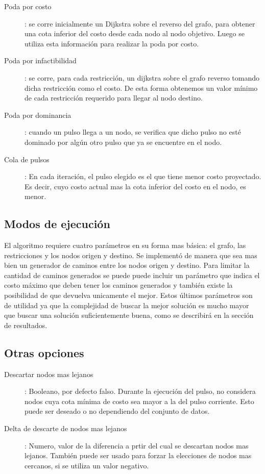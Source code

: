 \documentclass{article}
\begin{document}
  \begin{description}
    \item[Poda por costo]: {se corre inicialmente un Dijkstra sobre el reverso del grafo, para obtener una cota inferior del costo desde cada nodo al nodo objetivo. Luego se utiliza esta información para realizar la poda por costo.}
    \item[Poda por infactibilidad]: {se corre, para cada restricción, un dijkstra sobre el grafo reverso tomando dicha restricción como el costo. De esta forma obtenemos un valor mínimo de cada restricción requerido para llegar al nodo destino.}
    \item[Poda por dominancia]: {cuando un pulso llega a un nodo, se verifica que dicho pulso no esté dominado por algún otro pulso que ya se encuentre en el nodo.}
    \item[Cola de pulsos]: {En cada iteración, el pulso elegido es el que tiene menor costo proyectado. Es decir, cuyo costo actual mas la cota inferior del costo en el nodo, es menor.}
  \end{description}

  \subsection*{Modos de ejecución}

  El algoritmo requiere cuatro parámetros en su forma mas básica: el grafo, las restricciones y los nodos origen y destino. Se implementó de manera que sea mas bien un generador de caminos entre los nodos origen y destino. Para limitar la cantidad de caminos generados se puede puede incluir un parámetro que indica el costo máximo que deben tener los caminos generados y también existe la posibilidad de que devuelva unicamente el mejor. Estos últimos parámetros son de utilidad ya que la complejidad de buscar la mejor solución es mucho mayor que buscar una solución suficientemente buena, como se describirá en la sección de resultados.

  \subsection*{Otras opciones}

  \begin{description}
    \item[Descartar nodos mas lejanos]: Booleano, por defecto falso. Durante la ejecución del pulso, no considera nodos cuya cota mínima de costo sea mayor a la del pulso corriente. Esto puede ser deseado o no dependiendo del conjunto de datos.
    \item[Delta de descarte de nodos mas lejanos]: Numero, valor de la diferencia a prtir del cual se descartan nodos mas lejanos. También puede ser usado para forzar la elecciones de nodos mas cercanos, si se utiliza un valor negativo.
  \end{description}
\end{document}
